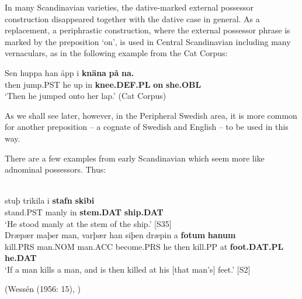 In many Scandinavian varieties, the dative-marked external possessor construction disappeared together with the dative case in general. As a replacement, a periphrastic construction, where the external possessor phrase is marked by the preposition  ‘on’, is used in Central Scandinavian including many vernaculars, as in the following example from the Cat Corpus: 


\ea\label{}
\gll Sen  huppa  han  åpp  i  \textbf{knäna} \textbf{på} \textbf{na.}\\
then  jump.PST  he  up  in  \textbf{knee.DEF.PL} \textbf{on} \textbf{she.OBL}\\
\glt ‘Then he jumped onto her lap.’ (Cat Corpus)
\z

As we shall see later, however, in the Peripheral Swedish area, it is more common for another preposition – a cognate of Swedish  and English  – to be used in this way.


There are a few examples from early Scandinavian which seem more like adnominal possessors. Thus:


\ea\label{}
	\ea 
		\\
		\gll stuþ  trikila  i  \textbf{stafn} \textbf{skibi}\\
		stand.PST  manly  in  \textbf{stem.DAT} \textbf{ship.DAT}\\
		\glt ‘He stood manly at the stem of the ship.’ [S35]
	\ex 
		\\
		\gll Dræpær  maþer  man, varþær  han  siþen  dræpin  a  \textbf{fotum} \textbf{hanum}\\
		kill.PRS  man.NOM  man.ACC become.PRS  he  then  kill.PP  at  \textbf{foot.DAT.PL} \textbf{he.DAT}\\
		\glt ‘If a man kills a man, and is then killed at his [that man’s] feet.’ [S2]
	\z 
\z

(Wessén (1956: 15), \citet[211]{Norde1997})

